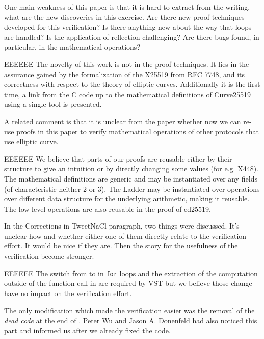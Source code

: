 One main weakness of this paper is that it is hard to extract
from the writing, what are the new discoveries in this
exercise. Are there new proof techniques developed for this
verification? Is there anything new about the way that loops
are handled? Is the application of reflection challenging? Are
there bugs found, in particular, in the mathematical operations?

\begin{answer}{EEEEEE}
The novelty of this work is not in the proof techniques. It
lies in the assurance gained by the formalization of the
X25519 from RFC 7748, and its correctness with respect to
the theory of elliptic curves. Additionally it is the first
time, a link from the C code up to the mathematical definitions of
Curve25519 using a single tool is presented.
\end{answer}

A related comment is that it is unclear from the paper
whether now we can re-use proofs in this paper to verify
mathematical operations of other protocols that use elliptic
curve.

\begin{answer}{EEEEEE}
We believe that parts of our proofs are reusable either by
their structure to give an intuition or by directly changing
some values (for e.g. X448). The mathematical definitions
are generic and may be instantiated over any fields (of characteristic
neither 2 or 3). The Ladder may be instantiated
over operations over different data structure for the underlying
arithmetic, making it reusable. The low level operations
\eg {} are also reusable in the proof of ed25519.
\end{answer}

In the Corrections in TweetNaCl paragraph, two things
were discussed. It’s unclear how and whether either one of
them directly relate to the verification effort. It would be nice
if they are. Then the story for the usefulness of the verification
become stronger.

\begin{answer}{EEEEEE}
The switch from  to  in \texttt{for} loops and the
extraction of the computation outside of the function call in
 are required by VST but we believe those
change have no impact on the verification effort.

The only modification which made the verification easier
was the removal of the \textit{dead code} at the end of
. Peter Wu and Jason A.
Donenfeld had also noticed this part and informed us after we
already fixed the code.
\end{answer}

